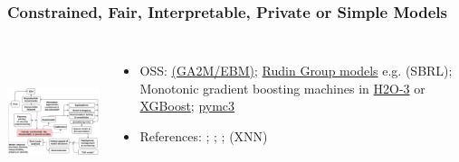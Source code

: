 \documentclass[11pt,
               aspectratio=169,
               hyperref={colorlinks}
               ]{beamer}
\begin{document}
			\begin{frame}
		
				\frametitle{Constrained, Fair, Interpretable, Private or Simple Models}		
			
				\begin{columns}
	
					\centering
	    			\includegraphics[height=120pt]{../img/rml_diagram_lec1_hilite.png}
					\vspace{-5pt}
					\small
					\begin{itemize}
						\item OSS: \href{https://github.com/interpretml/interpret}{ (GA2M/EBM)}; \href{https://users.cs.duke.edu/~cynthia/code.html}{Rudin Group models} e.g.  (SBRL); Monotonic gradient boosting machines in \href{https://github.com/h2oai/h2o-3/blob/master/h2o-py/demos/H2O_tutorial_gbm_monotonicity.ipynb}{H2O-3} or \href{https://xiaoxiaowang87.github.io/monotonicity_constraint/}{XGBoost}; \href{https://docs.pymc.io/}{pymc3}
						\item References: ; ; ;  (XNN)
					\end{itemize}
					\normalsize
				
				\end{columns}			
			
			\end{frame}
	
\end{document}
